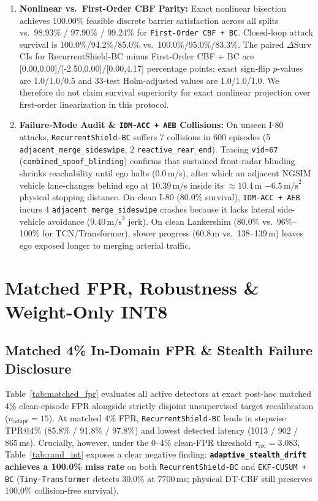 \documentclass[journal]{IEEEtran}
\begin{document}
\begin{enumerate}
    \item \textbf{Nonlinear vs.\ First-Order CBF Parity:} Exact nonlinear bisection achieves 100.00\% feasible discrete barrier satisfaction across all splits vs.\ 98.93\% / 97.90\% / 99.24\% for \texttt{First-Order CBF + BC}. Closed-loop attack survival is 100.0\%/94.2\%/85.0\% vs.\ 100.0\%/95.0\%/83.3\%. The paired $\Delta\text{Surv}$ CIs for RecurrentShield-BC minus First-Order CBF + BC are [0.00,0.00]/[-2.50,0.00]/[0.00,4.17] percentage points; exact sign-flip $p$-values are 1.0/1.0/0.5 and 33-test Holm-adjusted values are 1.0/1.0/1.0. We therefore do not claim survival superiority for exact nonlinear projection over first-order linearization in this protocol.
    \item \textbf{Failure-Mode Audit \& \texttt{IDM-ACC + AEB} Collisions:} On unseen I-80 attacks, \texttt{RecurrentShield-BC} suffers 7 collisions in 600 episodes (5 \texttt{adjacent\_merge\_sideswipe}, 2 \texttt{reactive\_rear\_end}). Tracing \texttt{vid=67} (\texttt{combined\_spoof\_blinding}) confirms that sustained front-radar blinding shrinks reachability until ego halts (0.0\,m/s), after which an adjacent NGSIM vehicle lane-changes behind ego at 10.39\,m/s inside its $\approx 10.4\,\text{m}$ $-6.5\,\text{m/s}^2$ physical stopping distance. On clean I-80 (80.0\% survival), \texttt{IDM-ACC + AEB} incurs 4 \texttt{adjacent\_merge\_sideswipe} crashes because it lacks lateral side-vehicle avoidance ($9.40\,\text{m/s}^3$ jerk). On clean Lankershim (80.0\% vs.\ 96\%--100\% for TCN/Transformer), slower progress (60.8\,m vs.\ 138--139\,m) leaves ego exposed longer to merging arterial traffic.
\end{enumerate}

\section{Matched FPR, Robustness \& Weight-Only INT8}

\subsection{Matched 4\% In-Domain FPR \& Stealth Failure Disclosure}
Table~\ref{tab:matched_fpr} evaluates all active detectors at exact post-hoc matched 4\% clean-episode FPR alongside strictly disjoint unsupervised target recalibration ($n_{\text{adapt}}=15$). At matched 4\% FPR, \texttt{RecurrentShield-BC} leads in stepwise TPR@4\% (85.8\% / 91.8\% / 97.8\%) and lowest detected latency (1013 / 902 / 865\,ms). Crucially, however, under the 0--4\% clean-FPR threshold $\tau_{\text{rec}}=3.083$, Table~\ref{tab:rand_int} exposes a clear negative finding: \textbf{\texttt{adaptive\_stealth\_drift} achieves a 100.0\% miss rate} on both \texttt{RecurrentShield-BC} and \texttt{EKF-CUSUM + BC} (\texttt{Tiny-Transformer} detects 30.0\% at 7700\,ms; physical DT-CBF still preserves 100.0\% collision-free survival).
\end{document}
